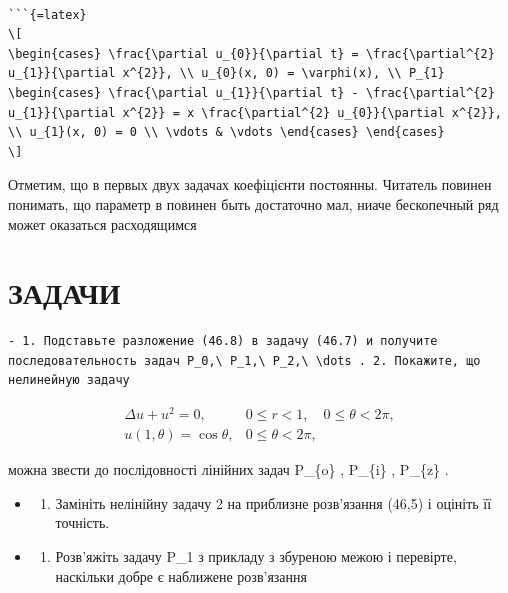 \documentclass[
]{article}
\providecommand{\tightlist}{%
  \setlength{\itemsep}{0pt}\setlength{\parskip}{0pt}}
\begin{document}
\begin{verbatim}

```{=latex}
\[
\begin{cases} \frac{\partial u_{0}}{\partial t} = \frac{\partial^{2} u_{1}}{\partial x^{2}}, \\ u_{0}(x, 0) = \varphi(x), \\ P_{1} \begin{cases} \frac{\partial u_{1}}{\partial t} - \frac{\partial^{2} u_{1}}{\partial x^{2}} = x \frac{\partial^{2} u_{0}}{\partial x^{2}}, \\ u_{1}(x, 0) = 0 \\ \vdots & \vdots \end{cases} \end{cases}
\]
\end{verbatim}

Отметим, що в первых двух задачах коефіцієнти постоянны. Читатель
повинен понимать, що параметр в повинен быть достаточно мал, ниаче
бескопечный ряд может оказаться расходящимся

\section{ЗАДАЧИ}\label{ux437ux430ux434ux430ux447ux438-8}

\begin{verbatim}
- 1. Подставьте разложение (46.8) в задачу (46.7) и получите последовательность задач P_0,\ P_1,\ P_2,\ \dots . 2. Покажите, що нелинейную задачу
\end{verbatim}

\[
\begin{aligned} \Delta u + u^2 = 0, & 0 \leqslant r < 1, \quad 0 \leqslant \theta < 2\pi, \\ u(1, \theta) = \cos \theta, & 0 \leqslant \theta < 2\pi, \end{aligned}
\]

можна звести до послідовності лінійних задач P\_\{o\} , P\_\{i\} ,
P\_\{z\} .

\begin{itemize}
\tightlist
\item
  \begin{enumerate}
  \def\labelenumi{\arabic{enumi}.}
  \setcounter{enumi}{2}
  \tightlist
  \item
    Замініть нелінійну задачу 2 на приблизне розв'язання (46,5) і
    оцініть її точність.
  \end{enumerate}
\item
  \begin{enumerate}
  \def\labelenumi{\arabic{enumi}.}
  \setcounter{enumi}{3}
  \tightlist
  \item
    Розв'яжіть задачу P\_1 з прикладу з збуреною межою і перевірте,
    наскільки добре є наближене розв'язання
  \end{enumerate}
\end{itemize}
\end{document}
